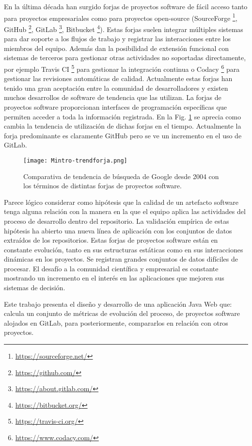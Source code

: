 En la última década han surgido forjas de proyectos software de fácil acceso tanto para proyectos empresariales como para proyectos open-source (SourceForge \footnote{\url{https://sourceforge.net/}}, GitHub \footnote{\url{https://github.com/}}, GitLab \footnote{\url{https://about.gitlab.com/}}, Bitbucket  \footnote{\url{https://bitbucket.org/}}).  Estas forjas suelen integrar múltiples sistemas para dar soporte a los flujos de trabajo y registrar las interacciones entre los miembros del equipo. Además dan la posibilidad de extensión funcional con sistemas de terceros para gestionar otras actividades no soportadas directamente, por ejemplo Travis CI
\footnote{\url{https://travis-ci.org/}} para gestionar la integración continua o Codacy \footnote{\url{https://www.codacy.com/}} para gestionar las revisiones automáticas de calidad. Actualmente estas forjas han tenido una gran aceptación entre la comunidad de desarrolladores y existen muchos desarrollos de software de tendencia que las utilizan. La forjas de proyectos software proporcionan interfaces de programación específicas que permiten acceder a toda la información registrada. 
En la Fig. \ref{fig:Mintro-trendforja} se aprecia como cambia la tendencia de utilización de dichas forjas en el tiempo. Actualmente la forja predominante es claramente GitHub pero se ve un incremento en el uso de GitLab.

\begin{figure}[!h]
	\centering
	\texttt{[image: Mintro-trendforja.png]}
	\caption{Comparativa de tendencia de búsqueda de Google desde 2004 con los términos de distintas forjas de proyectos software.}
	\label{fig:Mintro-trendforja}
\end{figure}
 
Parece lógico considerar como hipótesis que la calidad de un artefacto software tenga alguna relación con la manera en la que el equipo  aplica las actividades del proceso de desarrollo dentro del repositorio.  
La validación empírica de estas  hipótesis ha abierto una nueva línea de aplicación con los conjuntos de datos extraídos de los repositorios.  
Estas forjas de proyectos software están en constante evolución, tanto en sus estructuras estáticas como en sus interacciones dinámicas en los proyectos. Se registran grandes conjuntos de datos difíciles de procesar. El  desafío a la comunidad científica y empresarial  es constante mostrando un incremento en el interés en las aplicaciones que mejoren sus sistemas de decisión.

Este trabajo presenta el diseño y desarrollo de una aplicación Java Web que: calcula un conjunto de métricas de evolución del proceso,
 de proyectos software alojados en GitLab, para posteriormente, compararlos en relación con otros proyectos.

